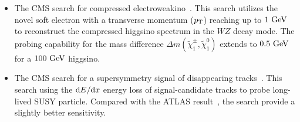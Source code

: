\documentclass[letterpaper,11pt]{article}
\begin{document}
\begin{itemize}
    \item The CMS search for compressed electroweakino~\cite{CMS-PAS-EXO-23-017}. This search utilizes the novel soft electron with a transverse momentum ($p_{\rm T}$) reaching up to $1~{\rm GeV}$ to reconstruct the compressed higgsino spectrum in the $WZ$ decay mode. The probing capability for the mass difference $\Delta m(\tilde{\chi}_1^\pm, \tilde{\chi}_1^0)$ extends to $0.5~{\rm GeV}$ for a $100~{\rm GeV}$ higgsino.
    \item The CMS search for a supersymmetry signal of disappearing tracks~\cite{CMS:2023mny}. This search using the ${\rm d}E/{\rm d}x$ energy loss of signal-candidate tracks to probe long-lived SUSY particle. Compared with the ATLAS result~\cite{ATLAS:2022rme}, the search provide a slightly better sensitivity. 

\end{itemize}
\end{document}
